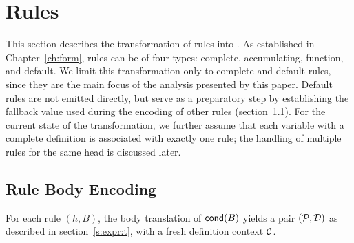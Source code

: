 \section{Rules}
\label{s:rules:t}

This section describes the transformation of \rego rules into \smtlib.
As established in Chapter~\ref{ch:form}, rules can be of four types: complete, accumulating, function, and default.
We limit this transformation only to complete and default rules, since they are the main focus of the analysis presented by this paper.
Default rules are not emitted directly, but serve as a preparatory step by establishing the fallback value used during the encoding of other rules (section~\ref{ss:rules:body}).
For the current state of the transformation, we further assume that each variable with a complete definition is associated with exactly one rule; the handling of multiple rules for the same head is discussed later.

\subsection{Rule Body Encoding}
\label{ss:rules:body}

For each rule $(h, B)$, the body translation of $\mathsf{cond}(B)$ yields a pair $(\mathcal{P}, \mathcal{D})$ as described in section~\ref{s:expr:t}, with a fresh definition context $\mathcal{C}$.

